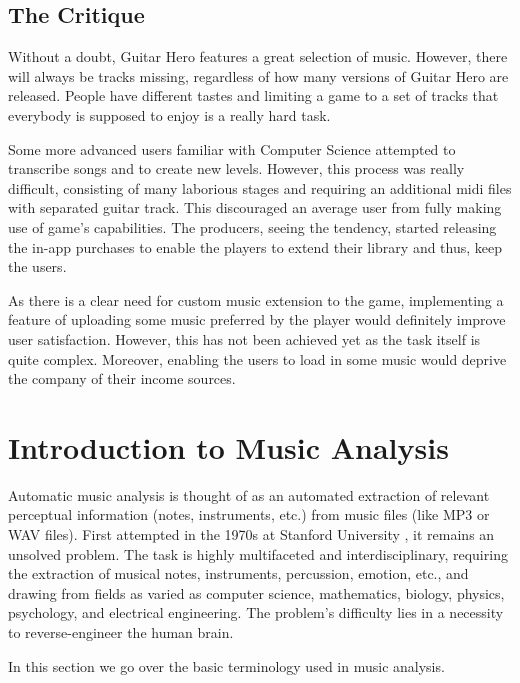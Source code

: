 \vspace{10pt}


\subsection*{The Critique}

Without a doubt, Guitar Hero features a great selection of music. However, there will always be tracks missing, regardless of how many versions of Guitar Hero are released. People have different tastes and limiting a game to a set of tracks that everybody is supposed to enjoy is a really hard task. 

Some more advanced users familiar with Computer Science attempted to transcribe songs and to create new levels. However, this process was really difficult, consisting of many laborious stages and requiring an additional midi files with separated guitar track. This discouraged an average user from fully making use of game’s capabilities. The producers, seeing the tendency, started releasing the in-app purchases to enable the players to extend their library and thus, keep the users. 

As there is a clear need for custom music extension to the game, implementing a feature of uploading some music preferred by the player would definitely improve user satisfaction. However, this has not been achieved yet as the task itself is quite complex. Moreover, enabling the users to load in some music would deprive the company of their income sources.

\vspace{30pt}

\section{Introduction to Music Analysis}

Automatic music analysis is thought of as an automated extraction of relevant perceptual information (notes, instruments, etc.) from music files (like MP3 or WAV files). First attempted in the 1970s at Stanford University \cite{moorer}, it remains an unsolved problem. The task is highly multifaceted and interdisciplinary, requiring the extraction of musical notes, instruments, percussion, emotion, etc., and drawing from fields as varied as computer science, mathematics, biology, physics, psychology, and electrical engineering. The problem's difficulty lies in a necessity to reverse-engineer the human brain. 

In this section we go over the basic terminology used in music analysis.

